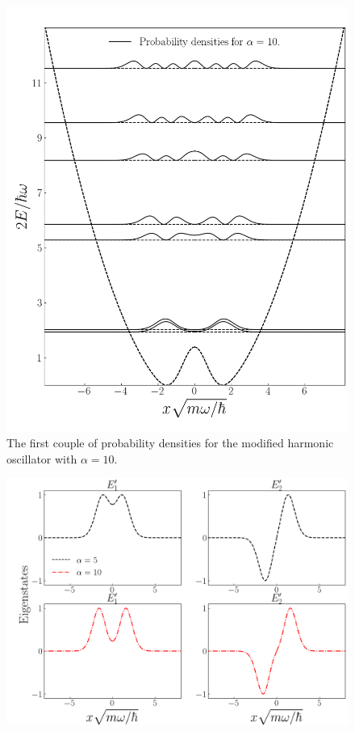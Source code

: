 \documentclass[twocolumn]{article}
\begin{document}
\begin{large}
\begin{figure}
    \centering
    \includegraphics[scale=0.37]{alpha10_density.png}
    \caption{The first couple of probability densities for the modified harmonic oscillator with $\alpha=10$.}
    \label{4apr2029}
\end{figure}
\begin{figure}[b!]
    \centering
    \includegraphics[scale=0.31]{first_eigenstates_alphas.png}

\end{figure}
\end{large}
\end{document}
